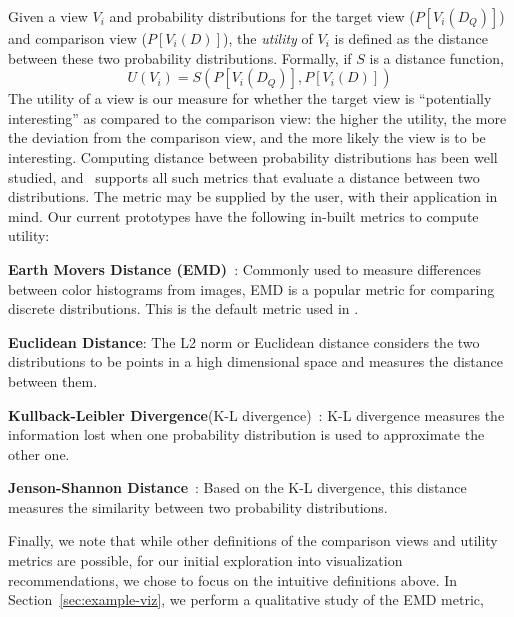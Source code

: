 Given a view $V_i$ and probability distributions for the
target view  ($P[V_i (D_Q)]$) and comparison view ($P[V_i (D)]$), the
{\em utility} of $V_i$ is defined as the distance between these two probability
distributions. Formally, if $S$ is a distance function,
$$ U (V_i) = S ( P[V_i (D_Q)], P[V_i (D)] )$$
The utility of a view is our measure for whether the target view is
``potentially interesting'' as compared to the comparison view:
the higher the utility, the more the deviation
from the comparison view, and the more likely the view is to be interesting.
Computing distance between probability distributions has
been well studied, and \VizRecDB\ supports all such
metrics that evaluate a distance between two distributions.
The metric may be supplied by the user, with their
application in mind.
Our current prototypes have the following in-built metrics
to compute utility:
\begin{denselist}
  \item {\bf Earth Movers Distance (EMD)}~\cite{wikipedia-prob-dist}: Commonly used to
  measure differences between color histograms from images, EMD is a popular metric for comparing
  discrete distributions. This is the default metric used in \VizRecDB.
  \item {\bf Euclidean Distance}: The L2 norm or
  Euclidean distance considers the two distributions to be points in a high
  dimensional space and measures the distance between them.
  \item {\bf Kullback-Leibler Divergence}(K-L divergence)~\cite{wikipedia-KL}:
  K-L divergence measures the information lost when one probability distribution is used to approximate
  the other one.
  \item {\bf Jenson-Shannon Distance}~\cite{wikipedia-JS,entropy-vis}: Based on
  the K-L divergence, this distance measures the similarity between two probability distributions.
\end{denselist}
Finally, we note that while other definitions of the comparison views and
utility metrics are possible, for our initial exploration into 
visualization recommendations, we chose to focus on the intuitive definitions above.
In Section~\ref{sec:example-viz}, we perform a qualitative study of the EMD metric,
